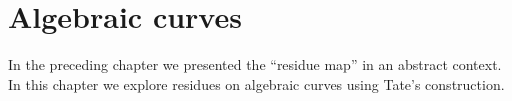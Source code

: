 \chapter{Algebraic curves}\label{ch:algebraic-curves}
In the preceding chapter we presented the ``residue map'' in an abstract context. In this chapter we explore residues on algebraic curves using Tate's construction. 

